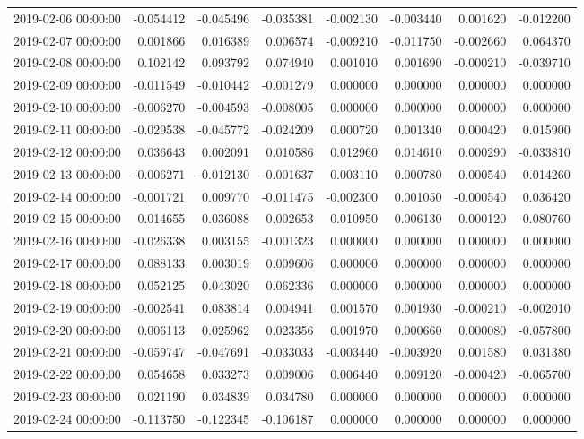 \begin{tabular}{lrrrrrrr}
2019-02-06 00:00:00 & -0.054412 & -0.045496 & -0.035381 & -0.002130 & -0.003440 & 0.001620 & -0.012200 \\
2019-02-07 00:00:00 & 0.001866 & 0.016389 & 0.006574 & -0.009210 & -0.011750 & -0.002660 & 0.064370 \\
2019-02-08 00:00:00 & 0.102142 & 0.093792 & 0.074940 & 0.001010 & 0.001690 & -0.000210 & -0.039710 \\
2019-02-09 00:00:00 & -0.011549 & -0.010442 & -0.001279 & 0.000000 & 0.000000 & 0.000000 & 0.000000 \\
2019-02-10 00:00:00 & -0.006270 & -0.004593 & -0.008005 & 0.000000 & 0.000000 & 0.000000 & 0.000000 \\
2019-02-11 00:00:00 & -0.029538 & -0.045772 & -0.024209 & 0.000720 & 0.001340 & 0.000420 & 0.015900 \\
2019-02-12 00:00:00 & 0.036643 & 0.002091 & 0.010586 & 0.012960 & 0.014610 & 0.000290 & -0.033810 \\
2019-02-13 00:00:00 & -0.006271 & -0.012130 & -0.001637 & 0.003110 & 0.000780 & 0.000540 & 0.014260 \\
2019-02-14 00:00:00 & -0.001721 & 0.009770 & -0.011475 & -0.002300 & 0.001050 & -0.000540 & 0.036420 \\
2019-02-15 00:00:00 & 0.014655 & 0.036088 & 0.002653 & 0.010950 & 0.006130 & 0.000120 & -0.080760 \\
2019-02-16 00:00:00 & -0.026338 & 0.003155 & -0.001323 & 0.000000 & 0.000000 & 0.000000 & 0.000000 \\
2019-02-17 00:00:00 & 0.088133 & 0.003019 & 0.009606 & 0.000000 & 0.000000 & 0.000000 & 0.000000 \\
2019-02-18 00:00:00 & 0.052125 & 0.043020 & 0.062336 & 0.000000 & 0.000000 & 0.000000 & 0.000000 \\
2019-02-19 00:00:00 & -0.002541 & 0.083814 & 0.004941 & 0.001570 & 0.001930 & -0.000210 & -0.002010 \\
2019-02-20 00:00:00 & 0.006113 & 0.025962 & 0.023356 & 0.001970 & 0.000660 & 0.000080 & -0.057800 \\
2019-02-21 00:00:00 & -0.059747 & -0.047691 & -0.033033 & -0.003440 & -0.003920 & 0.001580 & 0.031380 \\
2019-02-22 00:00:00 & 0.054658 & 0.033273 & 0.009006 & 0.006440 & 0.009120 & -0.000420 & -0.065700 \\
2019-02-23 00:00:00 & 0.021190 & 0.034839 & 0.034780 & 0.000000 & 0.000000 & 0.000000 & 0.000000 \\
2019-02-24 00:00:00 & -0.113750 & -0.122345 & -0.106187 & 0.000000 & 0.000000 & 0.000000 & 0.000000 \\

\end{tabular}
